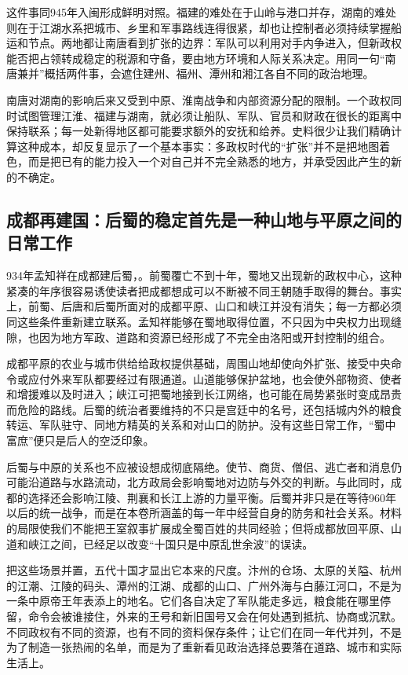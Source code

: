 这件事同945年入闽形成鲜明对照。福建的难处在于山岭与港口并存，湖南的难处则在于江湖水系把城市、乡里和军事路线连得很紧，却也让控制者必须持续掌握船运和节点。两地都让南唐看到扩张的边界：军队可以利用对手内争进入，但新政权能否把占领转成稳定的税源和守备，要由地方环境和人际关系决定。用同一句“南唐兼并”概括两件事，会遮住建州、福州、潭州和湘江各自不同的政治地理。

南唐对湖南的影响后来又受到中原、淮南战争和内部资源分配的限制。一个政权同时试图管理江淮、福建与湖南，就必须让船队、军队、官员和财政在很长的距离中保持联系；每一处新得地区都可能要求额外的安抚和给养。史料很少让我们精确计算这种成本，却反复显示了一个基本事实：多政权时代的“扩张”并不是把地图着色，而是把已有的能力投入一个对自己并不完全熟悉的地方，并承受因此产生的新的不确定。

\subsection{成都再建国：后蜀的稳定首先是一种山地与平原之间的日常工作}

934年孟知祥在成都建后蜀，。前蜀覆亡不到十年，蜀地又出现新的政权中心，这种紧凑的年序很容易诱使读者把成都想成可以不断被不同王朝随手取得的舞台。事实上，前蜀、后唐和后蜀所面对的成都平原、山口和峡江并没有消失；每一方都必须同这些条件重新建立联系。孟知祥能够在蜀地取得位置，不只因为中央权力出现缝隙，也因为地方军政、道路和资源已经形成了不完全由洛阳或开封控制的组合。

成都平原的农业与城市供给给政权提供基础，周围山地却使向外扩张、接受中央命令或应付外来军队都要经过有限通道。山道能够保护盆地，也会使外部物资、使者和增援难以及时进入；峡江可把蜀地接到长江网络，也可能在局势紧张时变成昂贵而危险的路线。后蜀的统治者要维持的不只是宫廷中的名号，还包括城内外的粮食转运、军队驻守、同地方精英的关系和对山口的防护。没有这些日常工作，“蜀中富庶”便只是后人的空泛印象。

后蜀与中原的关系也不应被设想成彻底隔绝。使节、商货、僧侣、逃亡者和消息仍可能沿道路与水路流动，北方政局会影响蜀地对边防与外交的判断。与此同时，成都的选择还会影响江陵、荆襄和长江上游的力量平衡。后蜀并非只是在等待960年以后的统一战争，而是在本卷所涵盖的每一年中经营自身的防务和社会关系。材料的局限使我们不能把王室叙事扩展成全蜀百姓的共同经验；但将成都放回平原、山道和峡江之间，已经足以改变“十国只是中原乱世余波”的误读。

把这些场景并置，五代十国才显出它本来的尺度。汴州的仓场、太原的关隘、杭州的江潮、江陵的码头、潭州的江湖、成都的山口、广州外海与白藤江河口，不是为一条中原帝王年表添上的地名。它们各自决定了军队能走多远，粮食能在哪里停留，命令会被谁接住，外来的王号和新旧国号又会在何处遇到抵抗、协商或沉默。不同政权有不同的资源，也有不同的资料保存条件；让它们在同一年代并列，不是为了制造一张热闹的名单，而是为了重新看见政治选择总要落在道路、城市和实际生活上。

